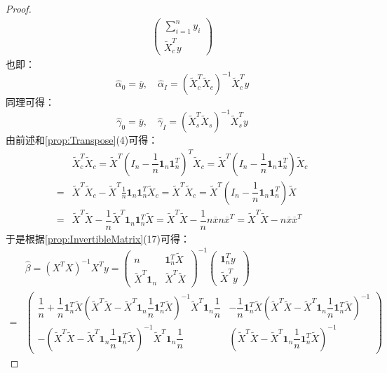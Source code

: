 \begin{proof}
\begin{gather*}
\begin{pmatrix}
			\sum\limits_{i=1}^{n}y_i \\
			\tilde{X}_c^Ty
		\end{pmatrix} 
	\end{gather*}
	也即：
	\begin{equation*}
		\hat{\alpha}_0=\overline{y},\quad\hat{\alpha}_I=(\tilde{X}_c^T\tilde{X}_c)^{-1}\tilde{X}_c^Ty
	\end{equation*}
	同理可得：
	\begin{equation*}
		\hat{\gamma}_0=\overline{y},\quad\hat{\gamma}_I=(\tilde{X}_s^T\tilde{X}_s)^{-1}\tilde{X}_s^Ty
	\end{equation*}
	由前述和\cref{prop:Transpose}(4)可得：
	\begin{align*}
		&\tilde{X}_c^T\tilde{X}_c=\tilde{X}^T\left(I_n-\dfrac{1}{n}\mathbf{1}_n\mathbf{1}_n^T\right)^T\tilde{X}_c=\tilde{X}^T\left(I_n-\dfrac{1}{n}\mathbf{1}_n\mathbf{1}_n^T\right)\tilde{X}_c \\
		=&\tilde{X}^T\tilde{X}_c-\tilde{X}^T\frac{1}{n}\mathbf{1}_n\mathbf{1}_n^T\tilde{X}_c=\tilde{X}^T\tilde{X}_c=\tilde{X}^T\left(I_n-\dfrac{1}{n}\mathbf{1}_n\mathbf{1}_n^T\right)\tilde{X} \\
		=&\tilde{X}^T\tilde{X}-\dfrac{1}{n}\tilde{X}^T\mathbf{1}_n\mathbf{1}_n^T\tilde{X}=\tilde{X}^T\tilde{X}-\dfrac{1}{n}n\overline{x}n\overline{x}^T=\tilde{X}^T\tilde{X}-n\overline{x}\overline{x}^T
	\end{align*}
	于是根据\cref{prop:InvertibleMatrix}(17)可得：
	\begin{align*}
		&\hat{\beta}=(X^TX)^{-1}X^Ty=
		\begin{pmatrix}
			n & \mathbf{1}_{n}^T\tilde{X} \\
			\tilde{X}^T\mathbf{1}_n & \tilde{X}^T\tilde{X}
		\end{pmatrix}^{-1}
		\begin{pmatrix}
			\mathbf{1}_n^Ty \\
			\tilde{X}^Ty
		\end{pmatrix} \\
		=&
		\begin{pmatrix}
			\dfrac{1}{n}+\dfrac{1}{n}\mathbf{1}_{n}^T\tilde{X}( \tilde{X}^T\tilde{X}-\tilde{X}^T\mathbf{1}_n\dfrac{1}{n}\mathbf{1}_{n}^T\tilde{X})^{-1}\tilde{X}^T\mathbf{1}_n\dfrac{1}{n} & -\dfrac{1}{n}\mathbf{1}_{n}^T\tilde{X}(\tilde{X}^T\tilde{X}-\tilde{X}^T\mathbf{1}_n\dfrac{1}{n}\mathbf{1}_{n}^T\tilde{X})^{-1} \\
			-(\tilde{X}^T\tilde{X}-\tilde{X}^T\mathbf{1}_n\dfrac{1}{n}\mathbf{1}_{n}^T\tilde{X})^{-1}\tilde{X}^T\mathbf{1}_n\dfrac{1}{n} & (\tilde{X}^T\tilde{X}-\tilde{X}^T\mathbf{1}_n\dfrac{1}{n}\mathbf{1}_{n}^T\tilde{X})^{-1}

\end{pmatrix}
\end{align*}
\end{proof}
